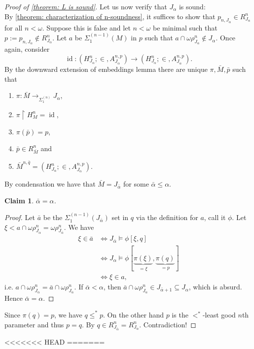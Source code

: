\documentclass[12pt,a4paper]{article}
\theoremstyle{nicestyle}
\newtheorem{claim}{Claim}[subsection]
\newenvironment{proofblack}{\begin{proof}}
  {\renewcommand{\qedsymbol}{$\blacksquare$}\end{proof}}
\DeclareMathOperator{\id}{id}
\begin{document}
\begin{proof}[Proof of \autoref{theorem: L is sound}]
      Let us now verify that $J_{\alpha}$ is sound: \\

      By \autoref{theorem: characterization of n-soundness}, it
      suffices to show that $p_{n, J_{\alpha}} \in R^{n}_{J_{\alpha}}$
      for all $n < \omega$. Suppose this is false and let $n < \omega$
      be minimal such that
      $p :=p_{n,J_{\alpha}} \not \in R^{n}_{J_{\alpha}}$. Let $a$ be
      $\Sigma^{(n-1)}_{1}(M)$ in $p$ such that
      $a \cap \omega\rho^{n}_{J_{\alpha}} \not \in J_{\alpha}$. Once
      again, consider
      \[
	\id \colon (H^{n}_{J_{\alpha}}; \in, A^{n, p}_{J_{\alpha}}) \to
        (H^{n}_{J_{\alpha}}; \in, A^{n, p}_{J_{\alpha}}).
      \]
      By the downward extension of embeddings lemma there are unique
      $\pi, \bar{M}, \bar{p}$ such that
      \begin{enumerate}
      \item $\pi \colon \bar{M} \to_{\Sigma^{(n)}_{1}} J_{\alpha}$,
      \item $\pi \restriction H^{n}_{M} = \id$,
      \item $\pi(\bar{p}) = p$,
      \item $\bar{p} \in R^{n}_{\bar{M}}$ and
      \item
        $\bar{M}^{n, \bar{q}} = (H^{n}_{J_{\alpha}}; \in, A^{n,
          p}_{J_{\alpha}})$.
      \end{enumerate}
      By condensation we have that $\bar{M} = J_{\bar{\alpha}}$ for
      some $\bar{\alpha} \leq \alpha$.

      \begin{claim}
        $\bar{\alpha} = \alpha$.
      \end{claim}

      \begin{proofblack}
        Let $\bar{a}$ be the $\Sigma^{(n-1)}_{1}(J_{\bar{\alpha}})$
        set in $q$ via the definition for $a$, call it $\phi$. Let
        $\xi < a \cap \omega\rho^{n}_{J_{\alpha}} =
        \omega\rho^{n}_{J_{\bar{\alpha}}}$. We have
        \begin{align*}
          \xi \in \bar{a} & \iff J_{\bar{\alpha}} \models \phi[\xi, q] \\
                          & \iff J_{\alpha} \models \phi[\underbrace{\pi(\xi)}_{= \xi}, \underbrace{\pi(q)}_{= p}] \\
                          & \iff \xi \in a,
        \end{align*}
        i.e.
        $a \cap \omega\rho^{n}_{J_{\alpha}} = \bar{a} \cap
        \omega\rho^{n}_{J_{\alpha}}$. If $\bar{\alpha} < \alpha$, then
        $\bar{a} \cap \omega\rho^{n}_{J_{\alpha}} \in
        J_{\bar{\alpha}+1} \subseteq J_{\alpha}$, which is
        absurd. Hence $\bar{\alpha} = \alpha$.
      \end{proofblack}

      Since $\pi(q) = p$, we have $q \le^{*} p$. On the other hand $p$
      is the $<^{*}$-least good $n$th parameter and thus $p = q$. By
      $q \in R^{n}_{J_{\bar{\alpha}}} =
      R^{n}_{J_{\alpha}}$. Contradiction!
    \end{proof}
<<<<<<< HEAD
=======
\end{document}
